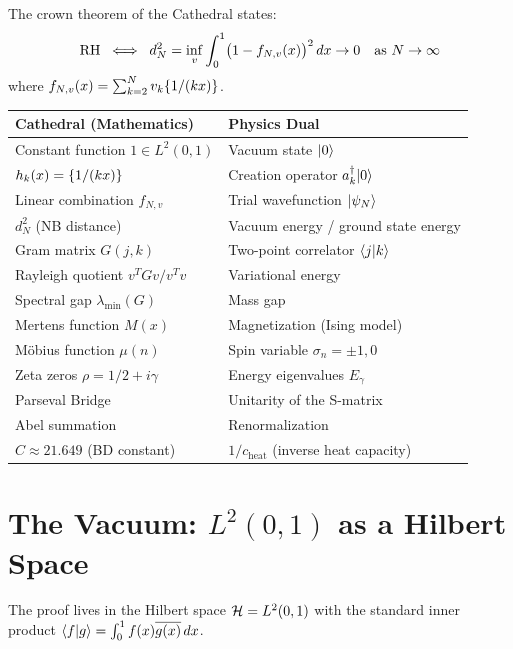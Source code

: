 \documentclass[11pt,a4paper]{article}
\begin{document}
The crown theorem of the Cathedral states:
\[
  \mathrm{RH} \;\iff\;
  d_N^2 = \inf_v \int_0^1 \bigl(1 - f_{N,v}(x)\bigr)^2\,dx \to 0
  \quad\text{as } N \to \infty
\]
where $f_{N,v}(x) = \sum_{k=2}^N v_k \{1/(kx)\}$.

\begin{correspondence}
\label{corr:master}
\begin{center}
\begin{tabular}{@{}ll@{}}
\toprule
\textbf{Cathedral (Mathematics)} & \textbf{Physics Dual} \\
\midrule
Constant function $1 \in L^2(0,1)$ & Vacuum state $| 0 \rangle$ \\
$h_k(x) = \{1/(kx)\}$ & Creation operator $a_k^\dagger | 0 \rangle$ \\
Linear combination $f_{N,v}$ & Trial wavefunction $| \psi_N \rangle$ \\
$d_N^2$ (NB distance) & Vacuum energy / ground state energy \\
Gram matrix $G(j,k)$ & Two-point correlator $\langle j | k \rangle$ \\
Rayleigh quotient $v^T G v / v^T v$ & Variational energy \\
Spectral gap $\lambda_{\min}(G)$ & Mass gap \\
Mertens function $M(x)$ & Magnetization (Ising model) \\
M\"obius function $\mu(n)$ & Spin variable $\sigma_n = \pm 1, 0$ \\
Zeta zeros $\rho = 1/2 + i\gamma$ & Energy eigenvalues $E_\gamma$ \\
Parseval Bridge & Unitarity of the S-matrix \\
Abel summation & Renormalization \\
$C \approx 21.649$ (BD constant) & $1/c_{\text{heat}}$ (inverse heat capacity) \\
\bottomrule
\end{tabular}
\end{center}
\end{correspondence}

\section{The Vacuum: $L^2(0,1)$ as a Hilbert Space}

The proof lives in the Hilbert space $\mathcal{H} = L^2(0,1)$ with the standard
inner product $\langle f | g \rangle = \int_0^1 f(x)\overline{g(x)}\,dx$.
\end{document}
